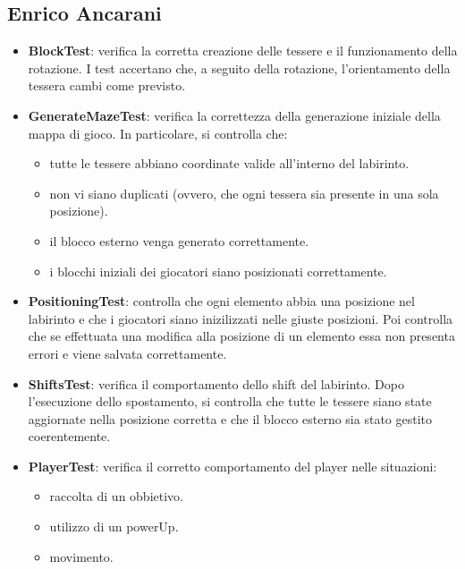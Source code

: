 \documentclass[a4paper,12pt]{report}
\begin{document}
\subsection{Enrico Ancarani}
\begin{itemize}
	\item \textbf{BlockTest}: verifica la corretta creazione delle tessere e il funzionamento della rotazione. I test accertano che, a seguito della rotazione, 
	l’orientamento della tessera cambi come previsto.
	\item \textbf{GenerateMazeTest}: verifica la correttezza della generazione iniziale della mappa di gioco. In particolare, si controlla che:
	\begin{itemize}
		\item tutte le tessere abbiano coordinate valide all’interno del labirinto.
		\item non vi siano duplicati (ovvero, che ogni tessera sia presente in una sola posizione).
		\item il blocco esterno venga generato correttamente.
		\item i blocchi iniziali dei giocatori siano posizionati correttamente.
	\end{itemize}
	\item \textbf{PositioningTest}: controlla che ogni elemento abbia una posizione nel labirinto e che i giocatori siano inizilizzati nelle giuste posizioni.
	Poi controlla che se effettuata una modifica alla posizione di un elemento essa non presenta errori e viene salvata correttamente.
	\item \textbf{ShiftsTest}: verifica il comportamento dello shift del labirinto. Dopo l’esecuzione dello spostamento, si controlla che 
	tutte le tessere siano state aggiornate nella posizione corretta e che il blocco esterno sia stato gestito coerentemente.
	\item \textbf{PlayerTest}: verifica il corretto comportamento del player nelle situazioni:
	\begin{itemize}
		\item raccolta di un obbietivo.
		\item utilizzo di un powerUp.
		\item movimento.
	\end{itemize}
\end{itemize}

\newpage
\end{document}
